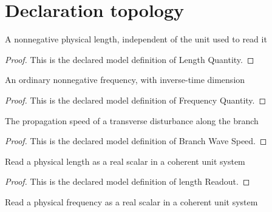 \section{Declaration topology}
\begin{definition}
  \label{def:physics:phyx-mini-0213:phyxminiproblems-problemphyxmini0213-lengthquantity}
  A nonnegative physical length, independent of the unit used to read it
\end{definition}
\begin{proof}
  This is the declared model definition of Length Quantity.
\end{proof}
\begin{definition}
  \label{def:physics:phyx-mini-0213:phyxminiproblems-problemphyxmini0213-frequencyquantity}
  An ordinary nonnegative frequency, with inverse-time dimension
\end{definition}
\begin{proof}
  This is the declared model definition of Frequency Quantity.
\end{proof}
\begin{definition}
  \label{def:physics:phyx-mini-0213:phyxminiproblems-problemphyxmini0213-branchwavespeed}
  The propagation speed of a transverse disturbance along the branch
\end{definition}
\begin{proof}
  This is the declared model definition of Branch Wave Speed.
\end{proof}
\begin{definition}
  \label{def:physics:phyx-mini-0213:phyxminiproblems-problemphyxmini0213-lengthreadout}
  Read a physical length as a real scalar in a coherent unit system
\end{definition}
\begin{proof}
  This is the declared model definition of length Readout.
\end{proof}
\begin{definition}
  \label{def:physics:phyx-mini-0213:phyxminiproblems-problemphyxmini0213-frequencyreadout}
  Read a physical frequency as a real scalar in a coherent unit system
\end{definition}
